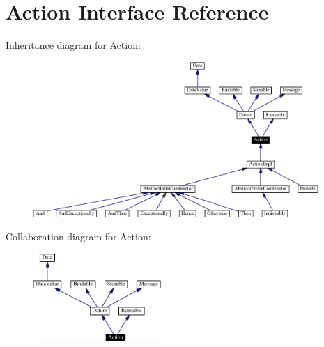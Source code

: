 \hypertarget{interfaceAction}{
\section{Action  Interface Reference}
\label{interfaceAction}
}
Inheritance diagram for Action:\begin{figure}[H]
\begin{center}
\leavevmode
\includegraphics[width=307pt]{interfaceAction__inherit__graph}
\end{center}
\end{figure}
Collaboration diagram for Action:\begin{figure}[H]
\begin{center}
\leavevmode
\includegraphics[width=137pt]{interfaceAction__coll__graph}
\end{center}
\end{figure}
